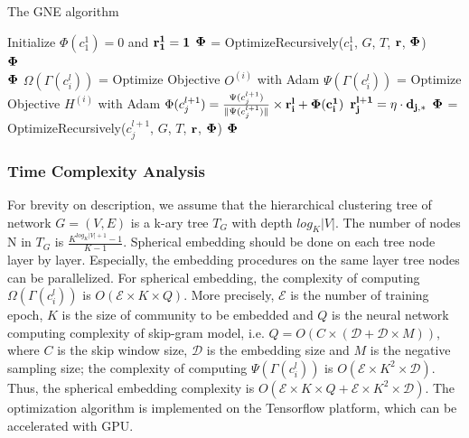 \documentclass{article}
\theoremstyle{definition}
\begin{document}
    \begin{algorithm}[H] 
\caption{The GNE algorithm} 
	\label{alg:gne} 
\begin{algorithmic}
	\State Initialize $\Phi(c^1_1) = 0$ and $\bf{r_1^1} = 1$
	\State $\bf{\Phi}$ = OptimizeRecursively($c_1^1$, $G$, $T$, $\bf{r}$, $\bf{\Phi}$) \\
	\Return $\bf{\Phi}$ 
\EndFunction
	\\\hrulefill
{} 
		\Return $\bf{\Phi}$		
	\EndIf
	\State $\Omega(\Gamma(c_i^{l}))$ = Optimize Objective $O^{(i)}$ with Adam
	\State $\Psi(\Gamma(c_i^{l}))$ = Optimize Objective $H^{(i)}$ with Adam
		\State $\Phi(c_j^{l+1}) = \frac{\Psi(c_j^{l+1})}{\lVert \Psi(c_j^{l+1}) \rVert}  \times \bf{r_i^{l}} + \Phi(c_i^{1})$
		\State $\bf{r_j^{l+1}} = \eta \cdot d_{j,*}$
	\EndFor
		\State $\bf{\Phi}$ = OptimizeRecursively($c_j^{l+1}$, $G$, $T$, $\bf{r}$, $\bf{\Phi}$) 
	\EndFor
	\Return $\bf{\Phi}$
\EndFunction
\end{algorithmic} 
\end{algorithm}

    \subsubsection{Time Complexity Analysis}
    For brevity on description, we assume that the hierarchical clustering tree of network $G=(V,E)$ is a k-ary tree $T_G$ with depth $log_K|V|$. The number of nodes N in $T_G$ is $\frac{K^{log_K|V|+1} -1}{K-1}$. Spherical embedding should be done on each tree node layer by layer. Especially, the embedding procedures on the same layer tree nodes can be parallelized. For spherical embedding, the complexity of computing $\Omega(\Gamma(c_i^{l}))$ is $O(\mathcal{E} \times K \times Q)$. More precisely, $\mathcal{E}$ is the number of training epoch, $K$ is the size of community to be embedded and $Q$ is the neural network computing complexity of skip-gram model, i.e. $Q=O(C \times (\mathcal{D}+\mathcal{D} \times M))$, where $C$ is the skip window size, $\mathcal{D}$ is the embedding size and $M$ is the negative sampling size; the complexity of computing $\Psi(\Gamma(c_i^{l}))$ is $O(\mathcal{E} \times K^2 \times \mathcal{D})$. Thus, the spherical embedding complexity is $O(\mathcal{E} \times K \times Q + \mathcal{E} \times K^2 \times \mathcal{D})$. The optimization algorithm is implemented on the Tensorflow platform, which can be accelerated with GPU.
\end{document}
